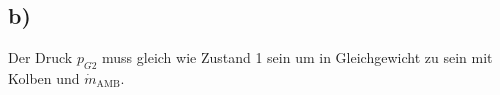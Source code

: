 

\subsection*{b)}
Der Druck $p_{G2}$ muss gleich wie Zustand 1 sein um in Gleichgewicht zu sein mit Kolben und $\dot{m}_{\text{AMB}}$.